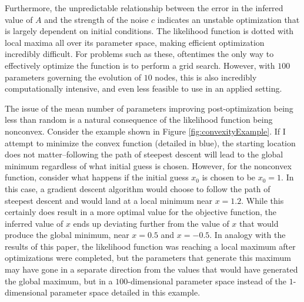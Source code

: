 \documentclass[12pt]{article}
\theoremstyle{definition}
\begin{document}
Furthermore, the unpredictable relationship between the error in the inferred value of $A$ and the strength of the noise $c$ indicates an unstable optimization that is largely dependent on initial conditions. The likelihood function is dotted with local maxima all over its parameter space, making efficient optimization incredibly difficult. For problems such as these, oftentimes the only way to effectively optimize the function is to perform a grid search. However, with $100$ parameters governing the evolution of $10$ nodes, this is also incredibly computationally intensive, and even less feasible to use in an applied setting.

The issue of the mean number of parameters improving post-optimization being less than random is a natural consequence of the likelihood function being nonconvex. Consider the example shown in Figure \ref{fig:convexityExample}. If I attempt to minimize the convex function (detailed in blue), the starting location does not matter--following the path of steepest descent will lead to the global minimum regardless of what initial guess is chosen. However, for the nonconvex function, consider what happens if the initial guess $x_0$ is chosen to be $x_0=1$. In this case, a gradient descent algorithm would choose to follow the path of steepest descent and would land at a local minimum near $x=1.2$. While this certainly does result in a more optimal value for the objective function, the inferred value of $x$ ends up deviating further from the value of $x$ that would produce the global minimum, near $x=0.5$ and $x = -0.5$. In analogy with the results of this paper, the likelihood function was reaching a local maximum after optimizations were completed, but the parameters that generate this maximum may have gone in a separate direction from the values that would have generated the global maximum, but in a $100$-dimensional parameter space instead of the $1$-dimensional parameter space detailed in this example. 
\end{document}
